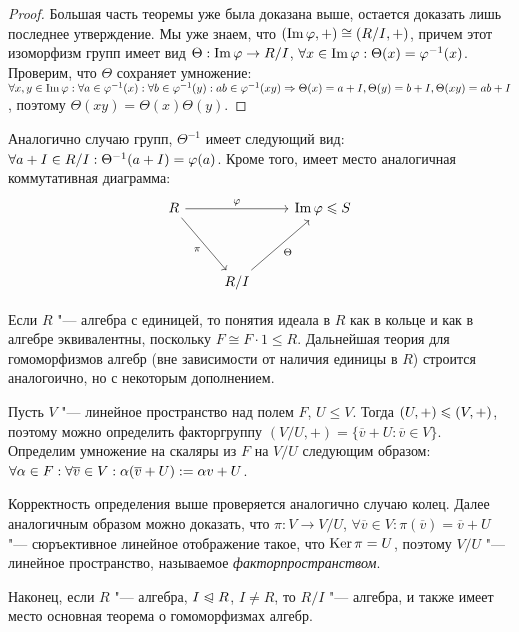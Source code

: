 \begin{proof}
	Большая часть теоремы уже была доказана выше, остается доказать лишь последнее утверждение. Мы уже знаем, что $(\operatorname{Im}\varphi, +) \cong (R / I, +)$, причем этот изоморфизм групп имеет вид $\Theta: \operatorname{Im}\varphi \to R / I$, $\forall x \in \operatorname{Im}\varphi: \Theta(x) = \varphi^{-1}(x)$. Проверим, что $\Theta$ сохраняет умножение: $\forall x, y \in \im\phi: \forall a \in \phi^{-1}(x): \forall b \in \phi^{-1}(y): ab \hm\in \phi^{-1}(xy) \ra \Theta(x) = a + I, \Theta(y) = b + I, \Theta(xy) = ab + I$, поэтому $\Theta(xy) = \Theta(x)\Theta(y)$.
\end{proof}

\begin{note}
	Аналогично случаю групп, $\Theta^{-1}$ имеет следующий вид: $\forall a + I \in R / I: \Theta^{-1}(a \hm+ I) = \phi(a)$. Кроме того, имеет место аналогичная коммутативная диаграмма:
	\[
	\begin{tikzcd}[row sep = huge]
		R \arrow{rr}{\phi} \arrow[swap]{dr}{\pi} && \im\phi \le S \\
		& R / I \arrow[swap]{ur}{\Theta} &
	\end{tikzcd}
	\]
\end{note}

\begin{note}
	Если $R$ "--- алгебра с единицей, то понятия идеала в $R$ как в кольце и как в алгебре эквивалентны, поскольку $F \cong F \cdot 1 \le R$. Дальнейшая теория для гомоморфизмов алгебр (вне зависимости от наличия единицы в $R$) строится аналогоично, но с некоторым дополнением.
\end{note}

\begin{definition}
	Пусть $V$ "--- линейное пространство над полем $F$, $U \le V$. Тогда $(U, +) \hm\le (V, +)$, поэтому можно определить факторгруппу $(V / U, +) = \{\overline{v} + U: \overline{v} \in V\}$. Определим умножение на скаляры из $F$ на $V / U$ следующим образом: $\forall \alpha \in F: \forall \overline{v} \in V: \alpha(\overline{v} + U) \hm{:=} \alpha v + U$.
\end{definition}

\begin{note}
	Корректность определения выше проверяется аналогично случаю колец. Далее аналогичным образом можно доказать, что $\pi: V \to V / U$, $\forall \overline{v} \in V: \pi(\overline{v}) = \overline{v} + U$ "--- сюръективное линейное отображение такое, что $\operatorname{Ker}\pi = U$, поэтому $V / U$ "--- линейное пространство, называемое \textit{факторпространством}.
	
	Наконец, если $R$ "--- алгебра, $I \trianglelefteqslant R$, $I \ne R$, то $R / I$ "--- алгебра, и также имеет место основная теорема о гомоморфизмах алгебр.
\end{note}

